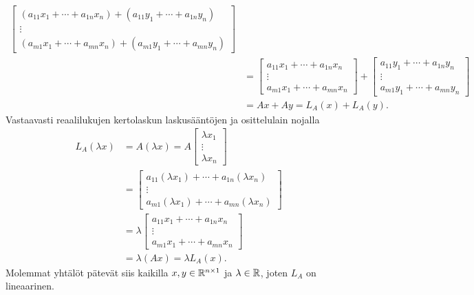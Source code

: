 \documentclass[11pt,a4paper]{amsart}
\begin{document}
\begin{solution}
\[\begin{aligned}
\begin{bmatrix}
        (a_{11}x_1+\cdots+a_{1n}x_n)
        +(a_{11}y_1+\cdots+a_{1n}y_n) \\
        \vdots \\
        (a_{m1}x_1+\cdots+a_{mn}x_n)
        +(a_{m1}y_1+\cdots+a_{mn}y_n)
      \end{bmatrix}
      \\[1ex]
      &=
      \begin{bmatrix}
        a_{11}x_1+\cdots+a_{1n}x_n \\
        \vdots \\
        a_{m1}x_1+\cdots+a_{mn}x_n
      \end{bmatrix}
      +
      \begin{bmatrix}
        a_{11}y_1+\cdots+a_{1n}y_n \\
        \vdots \\
        a_{m1}y_1+\cdots+a_{mn}y_n
      \end{bmatrix}
      \\[1ex]
      &= Ax+Ay = L_A(x)+L_A(y).
    \end{aligned}
  \]
  Vastaavasti reaalilukujen kertolaskun laskusääntöjen ja osittelulain
  nojalla
  \[
    \begin{aligned}
      L_A(\lambda x)
      &= A(\lambda x)
      = A
      \begin{bmatrix} \lambda x_1 \\ \vdots \\ \lambda x_n
      \end{bmatrix}
      \\[1ex]
      &=
      \begin{bmatrix}
        a_{11}(\lambda x_1)+\cdots+a_{1n}(\lambda x_n) \\
        \vdots \\
        a_{m1}(\lambda x_1)+\cdots+a_{mn}(\lambda x_n)
      \end{bmatrix}
      \\[1ex]
      &= \lambda
      \begin{bmatrix}
        a_{11}x_1+\cdots+a_{1n}x_n \\
        \vdots \\
        a_{m1}x_1+\cdots+a_{mn}x_n
      \end{bmatrix}
      \\[1ex]
      &= \lambda(Ax) = \lambda L_A(x).
    \end{aligned}
  \]
  Molemmat yhtälöt pätevät siis kaikilla \(x,y \in \mathbb{R}^{n\times 1}\)
  ja \(\lambda \in \mathbb{R}\), joten \(L_A\) on lineaarinen.
\end{solution}
\end{document}
